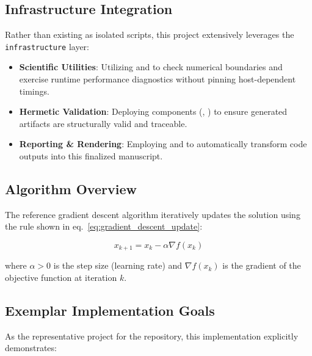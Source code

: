 \documentclass[
  english,
]{article}
\providecommand{\tightlist}{%
  \setlength{\itemsep}{0pt}\setlength{\parskip}{0pt}}
\begin{document}
\subsection{Infrastructure
Integration}\label{infrastructure-integration}

Rather than existing as isolated scripts, this project extensively
leverages the \texttt{infrastructure} layer:

\begin{itemize}
\tightlist
\item
  \textbf{Scientific Utilities}: Utilizing
   and
   to check numerical
  boundaries and exercise runtime performance diagnostics without
  pinning host-dependent timings.
\item
  \textbf{Hermetic Validation}: Deploying
   components
  (, ) to ensure
  generated artifacts are structurally valid and traceable.
\item
  \textbf{Reporting \& Rendering}: Employing
   and
   to automatically
  transform code outputs into this finalized manuscript.
\end{itemize}

\subsection{Algorithm Overview}\label{algorithm-overview}

The reference gradient descent algorithm iteratively updates the
solution using the rule shown in eq.~\ref{eq:gradient_descent_update}:

\begin{equation}
\label{eq:gradient_descent_update}
x_{k+1} = x_k - \alpha \nabla f(x_k)
\end{equation}

where \(\alpha > 0\) is the step size (learning rate) and
\(\nabla f(x_k)\) is the gradient of the objective function at iteration
\(k\).

\subsection{Exemplar Implementation
Goals}\label{exemplar-implementation-goals}

As the representative project for the repository, this implementation
explicitly demonstrates:
\end{document}
